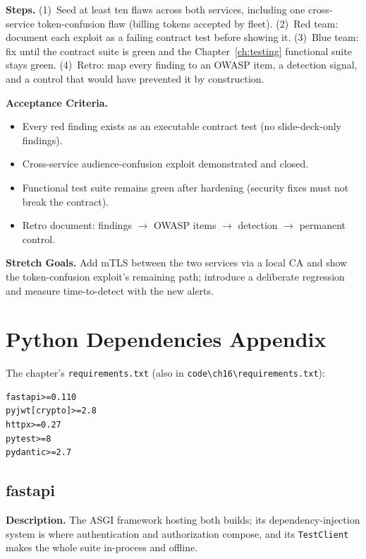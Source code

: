 \textbf{Steps.} (1)~Seed at least ten flaws across both services,
including one cross-service token-confusion flaw (billing tokens accepted
by fleet). (2)~Red team: document each exploit as a failing contract test
before showing it. (3)~Blue team: fix until the contract suite is green
and the Chapter~\ref{ch:testing} functional suite stays green. (4)~Retro:
map every finding to an OWASP item, a detection signal, and a control that
would have prevented it by construction.

\textbf{Acceptance Criteria.}
\begin{itemize}[itemsep=0.2em]
  \item[$\square$] Every red finding exists as an executable contract test
        (no slide-deck-only findings).
  \item[$\square$] Cross-service audience-confusion exploit demonstrated
        and closed.
  \item[$\square$] Functional test suite remains green after hardening
        (security fixes must not break the contract).
  \item[$\square$] Retro document: findings $\to$ OWASP items $\to$
        detection $\to$ permanent control.
\end{itemize}

\textbf{Stretch Goals.} Add mTLS between the two services via a local CA
and show the token-confusion exploit's remaining path; introduce a
deliberate regression and measure time-to-detect with the new alerts.

\section{Python Dependencies Appendix}
\label{sec:ch16-deps}

The chapter's \texttt{requirements.txt} (also in
\texttt{code\textbackslash{}ch16\textbackslash{}requirements.txt}):

\begin{verbatim}
fastapi>=0.110
pyjwt[crypto]>=2.8
httpx>=0.27
pytest>=8
pydantic>=2.7
\end{verbatim}

\subsection{fastapi}

\textbf{Description.} The ASGI framework hosting both builds; its
dependency-injection system is where authentication and authorization
compose, and its \texttt{TestClient} makes the whole suite in-process and
offline.

